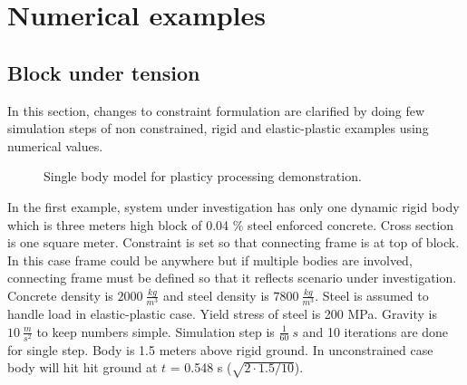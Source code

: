 \section{Numerical examples}

\subsection{Block under tension}
In this section, changes to constraint formulation are clarified by doing few simulation steps
of non constrained, rigid and
elastic-plastic examples using numerical values.

\begin{figure}[htb!]
\centering
{}
\caption{Single body model for plasticy processing demonstration.}
\label{fig:tensionModel}
\end{figure}

In the first example, system under investigation
has only one dynamic rigid body which is three meters high block of 0.04 \% steel enforced concrete. 
Cross section is one square meter.
Constraint is set so that connecting frame is at top of block. 
In this case frame could be anywhere but if multiple bodies are involved, connecting frame must be defined
so that it reflects scenario under investigation.
Concrete density is $2000\ \frac{kg}{m^3}$ and steel density is $7800\ \frac{kg}{m^3}$. 
Steel is assumed to handle load in elastic-plastic case. Yield stress of steel is 200 MPa.
Gravity is $10\ \frac{m}{s^2}$ to keep numbers simple. 
Simulation step is $\frac{1}{60}\ s$ and 10 
iterations are done for single step.
Body is 1.5 meters above rigid ground. In unconstrained case body will hit hit ground at $t$ = 0.548 s 
($\sqrt{2 \cdot 1.5 / 10}$).

